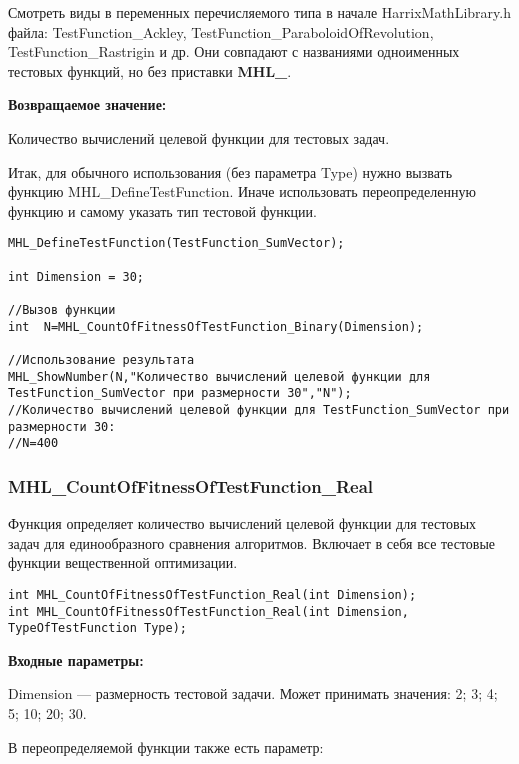 \documentclass[a4paper,12pt]{article}
\begin{document}
Смотреть виды в переменных перечисляемого типа в начале HarrixMathLibrary.h файла: TestFunction\_Ackley, TestFunction\_ParaboloidOfRevolution, TestFunction\_Rastrigin и др. Они совпадают с названиями одноименных тестовых функций, но без приставки \textbf{MHL\_}.

\textbf{Возвращаемое значение:}
 
Количество вычислений целевой функции для тестовых задач.

Итак, для обычного использования (без параметра Type) нужно вызвать функцию MHL\_DefineTestFunction. Иначе использовать переопределенную функцию и самому указать тип тестовой функции.


\begin{lstlisting}[label=code_use_MHL_CountOfFitnessOfTestFunction_Binary,caption=Пример использования]
MHL_DefineTestFunction(TestFunction_SumVector);

int Dimension = 30;

//Вызов функции
int  N=MHL_CountOfFitnessOfTestFunction_Binary(Dimension);

//Использование результата
MHL_ShowNumber(N,"Количество вычислений целевой функции для TestFunction_SumVector при размерности 30","N");
//Количество вычислений целевой функции для TestFunction_SumVector при размерности 30:
//N=400
\end{lstlisting}

\subsubsection{MHL\_CountOfFitnessOfTestFunction\_Real}\label{MHL_CountOfFitnessOfTestFunction_Real}

Функция определяет количество вычислений целевой функции для тестовых задач для единообразного сравнения алгоритмов. Включает в себя все тестовые функции вещественной оптимизации.


\begin{lstlisting}[label=code_syntax_MHL_CountOfFitnessOfTestFunction_Real,caption=Синтаксис]
int MHL_CountOfFitnessOfTestFunction_Real(int Dimension);
int MHL_CountOfFitnessOfTestFunction_Real(int Dimension, TypeOfTestFunction Type);
\end{lstlisting}

\textbf{Входные параметры:}

Dimension --- размерность тестовой задачи. Может принимать значения: 2; 3; 4; 5; 10; 20; 30.

В переопределяемой функции также есть параметр:
  
\end{document}
